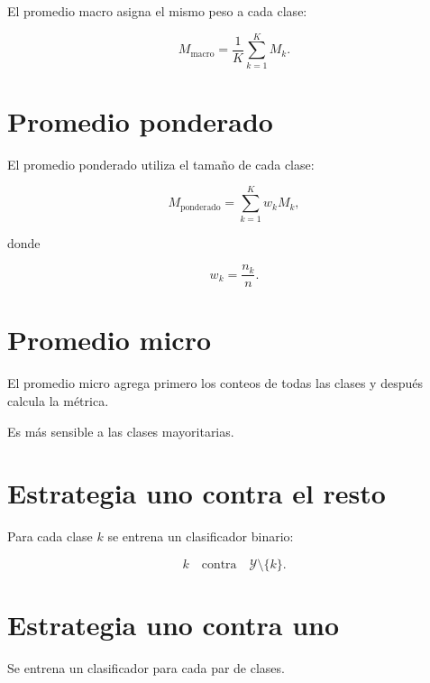 \documentclass[
  spanish,
  10.5pt,
  letterpaper,
  DIV=11,
  numbers=noendperiod,
  oneside,
  open=any]{scrreprt}
\theoremstyle{definition}
\theoremstyle{definition}
\theoremstyle{plain}
\theoremstyle{remark}
\begin{document}

El promedio macro asigna el mismo peso a cada clase:

\[
M_{\text{macro}}
=
\frac{1}{K}
\sum_{k=1}^{K}
M_k.
\]

\section*{Promedio ponderado}\label{promedio-ponderado}


El promedio ponderado utiliza el tamaño de cada clase:

\[
M_{\text{ponderado}}
=
\sum_{k=1}^{K}
w_kM_k,
\]

donde

\[
w_k
=
\frac{n_k}{n}.
\]

\section*{Promedio micro}\label{promedio-micro}


El promedio micro agrega primero los conteos de todas las clases y
después calcula la métrica.

Es más sensible a las clases mayoritarias.

\section*{Estrategia uno contra el
resto}\label{estrategia-uno-contra-el-resto}


Para cada clase \(k\) se entrena un clasificador binario:

\[
k
\quad
\text{contra}
\quad
\mathcal{Y}\setminus\{k\}.
\]

\section*{Estrategia uno contra uno}\label{estrategia-uno-contra-uno}


Se entrena un clasificador para cada par de clases.
\end{document}
